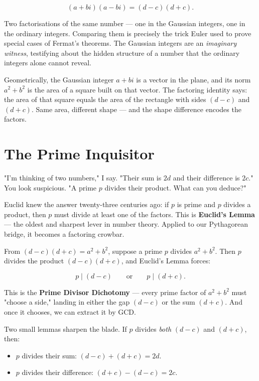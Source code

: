 \documentclass[11pt,twoside,openright]{book}
\theoremstyle{definition}
\theoremstyle{remark}
\begin{document}
\[(a + bi)(a - bi) = (d - c)(d + c).\]

Two factorisations of the same number --- one in the Gaussian integers, one in the ordinary integers. Comparing them is precisely the trick Euler used to prove special cases of Fermat's theorems. The Gaussian integers are an \textit{imaginary witness}, testifying about the hidden structure of a number that the ordinary integers alone cannot reveal.

Geometrically, the Gaussian integer $a + bi$ is a vector in the plane, and its norm $a^2 + b^2$ is the area of a square built on that vector. The factoring identity says: the area of that square equals the area of the rectangle with sides $(d - c)$ and $(d + c)$. Same area, different shape --- and the shape difference encodes the factors.



\section{The Prime Inquisitor}

"I'm thinking of two numbers," I say. "Their sum is $2d$ and their difference is $2c$." You look suspicious. "A prime $p$ divides their product. What can you deduce?"

Euclid knew the answer twenty-three centuries ago: if $p$ is prime and $p$ divides a product, then $p$ must divide at least one of the factors. This is \textbf{Euclid's Lemma} --- the oldest and sharpest lever in number theory. Applied to our Pythagorean bridge, it becomes a factoring crowbar.

From $(d - c)(d + c) = a^2 + b^2$, suppose a prime $p$ divides $a^2 + b^2$. Then $p$ divides the product $(d - c)(d + c)$, and Euclid's Lemma forces:

\[p \mid (d - c) \qquad \text{or} \qquad p \mid (d + c).\]

This is the \textbf{Prime Divisor Dichotomy} --- every prime factor of $a^2 + b^2$ must "choose a side," landing in either the gap $(d - c)$ or the sum $(d + c)$. And once it chooses, we can extract it by GCD.

Two small lemmas sharpen the blade. If $p$ divides \textit{both} $(d - c)$ and $(d + c)$, then:

\begin{itemize}
  \item $p$ divides their sum: $(d - c) + (d + c) = 2d$.
  \item $p$ divides their difference: $(d + c) - (d - c) = 2c$.
\end{itemize}
\end{document}
